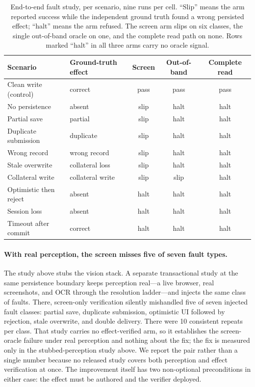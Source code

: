 \begin{table}[t]
\centering
\caption{End-to-end fault study, per scenario, nine runs per cell. ``Slip''
means the arm reported success while the independent ground truth found a wrong
persisted effect; ``halt'' means the arm refused. The screen arm slips on six
classes, the single out-of-band oracle on one, and the complete read path on
none. Rows marked ``halt'' in all three arms carry no oracle signal.}
\label{tab:e2eclasses}
\small
\begin{tabular}{llccc}
\toprule
Scenario & Ground-truth effect & Screen & Out-of-band & Complete read \\
\midrule
Clean write (control)    & correct          & pass & pass & pass \\
No persistence           & absent           & slip & halt & halt \\
Partial save             & partial          & slip & halt & halt \\
Duplicate submission     & duplicate        & slip & halt & halt \\
Wrong record             & wrong record     & slip & halt & halt \\
Stale overwrite          & collateral loss  & slip & halt & halt \\
Collateral write         & collateral write & slip & slip & halt \\
Optimistic then reject   & absent           & halt & halt & halt \\
Session loss             & absent           & halt & halt & halt \\
Timeout after commit     & correct          & halt & halt & halt \\
\bottomrule
\end{tabular}
\end{table}

\paragraph{With real perception, the screen misses five of seven fault types.}
The study above stubs the vision stack. A separate transactional study at the
same persistence boundary keeps perception real---a live browser, real
screenshots, and OCR through the resolution ladder---and injects the same class
of faults. There, screen-only
verification silently mishandled five of seven injected fault classes: partial
save, duplicate submission, optimistic UI followed by rejection, stale overwrite,
and double delivery. There were 10 consistent repeats per class. That study
carries no effect-verified arm, so it establishes the screen-oracle failure
under real perception and nothing about the fix; the fix is measured only in the
stubbed-perception study above. We report the pair rather than a single number
because no released study covers both perception and effect verification at
once. The improvement itself has two non-optional
preconditions in either case: the effect must be authored and the verifier
deployed.

